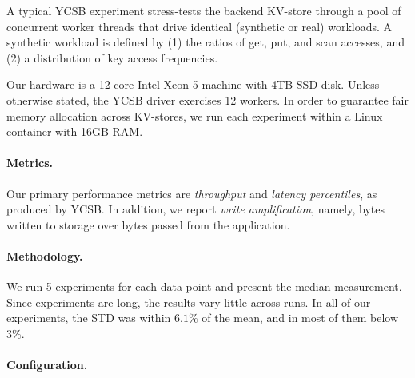 
A typical YCSB experiment stress-tests the backend KV-store through a pool of concurrent worker threads that drive identical
(synthetic or real) workloads. A synthetic workload is defined by  (1) the ratios of get, put, and scan accesses, and 
(2) a distribution of key access frequencies. 

Our hardware is a 12-core Intel Xeon 5 machine with 4TB SSD disk. Unless otherwise stated, the YCSB driver  
exercises 12 workers. In order to guarantee fair memory allocation across KV-stores, 
we run each experiment within a Linux container with 16GB RAM. 

\paragraph{Metrics.} Our primary performance metrics are \emph{throughput} 
and \emph{latency percentiles}, as produced by YCSB. In addition, we report \emph{write amplification}, 
namely, bytes written to storage over bytes passed from the application. 

\paragraph{Methodology.} 
We run 5 experiments for each data point and present the median measurement. Since experiments are long, the results vary 
little across runs. In all of our experiments, the STD was within $6.1\%$ of the mean, and in most of them below $3\%$. 

\paragraph{Configuration.} 

